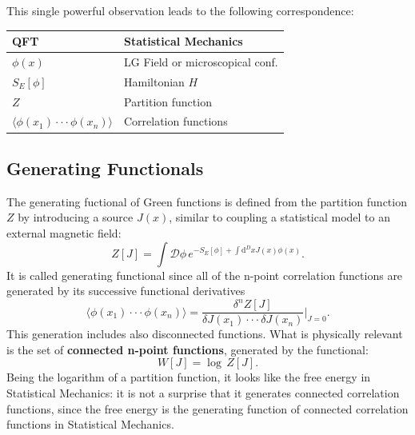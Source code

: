 This single powerful observation leads to the following correspondence:
\begin{table}[H]
    \centering
    \begin{tabular}{ll}
        \toprule
        \textbf{QFT}                                            & \textbf{Statistical Mechanics}  \\
        \midrule
        \(\phi(x)\)                                             & LG Field or microscopical conf. \\
        \(S_{E}[\phi]\)                                         & Hamiltonian \(H\)               \\
        \(Z\)                                                   & Partition function              \\
        \(\langle\phi(x_{1})\cdot\cdot\cdot\phi(x_{n})\rangle\) & Correlation functions           \\
        \bottomrule
    \end{tabular}
\end{table}

\subsection{Generating Functionals}

The generating fuctional of Green functions is defined from the partition function \(Z\) by introducing a source \(J(x)\), similar to coupling a statistical model to an external magnetic field:
\begin{equation}
    Z[J]=\int\mathcal{D}\phi \, e^{-S_{E}[\phi]+\int \mathrm{d}^{D}xJ(x)\phi(x)}.
    \label{eq:generating_functional}
\end{equation}
It is called generating functional since all of the n-point correlation functions are generated by its successive functional derivatives
\[
    \langle\phi(x_{1})\cdot\cdot\cdot\phi(x_{n})\rangle=\frac{\delta^{n}Z[J]}{\delta J(x_{1})\cdot\cdot\cdot\delta J(x_{n})}\bigg|_{J=0}.
\]
This generation includes also disconnected functions.
What is physically relevant is the set of \textbf{connected n-point functions}, generated by the functional:
\begin{equation}
    W[J]=\log \, Z[J].
    \label{eq:connected_generating_functional}
\end{equation}
Being the logarithm of a partition function, it looks like the free energy in Statistical Mechanics: it is not a surprise that it generates connected correlation functions, since the free energy is the generating function of connected correlation functions in Statistical Mechanics.

